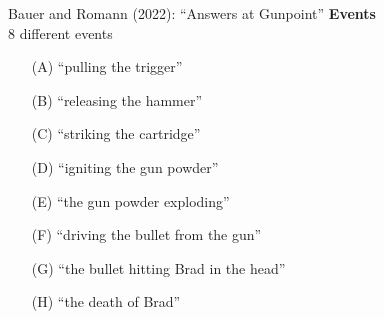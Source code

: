 \documentclass[xcolor=table,9pt,aspectratio=169]{beamer}
\begin{document}
\begin{frame}{\vspace*{10mm}Bauer and Romann (2022): ``Answers at Gunpoint''}
\vspace*{-5mm}
\textbf{Events}\\
8 different events
\begin{itemize}
   \item[(A)] ``pulling the trigger''
   \item[(B)] ``releasing the hammer''
   \item[(C)] ``striking the cartridge''
   \item[(D)] ``igniting the gun powder''
   \item[(E)] ``the gun powder exploding''
   \item[(F)] ``driving the bullet from the gun''
   \item[(G)] ``the bullet hitting Brad in the head''
   \item[(H)] ``the death of Brad''
\end{itemize}
\vfill
{}
\end{frame}
\end{document}
